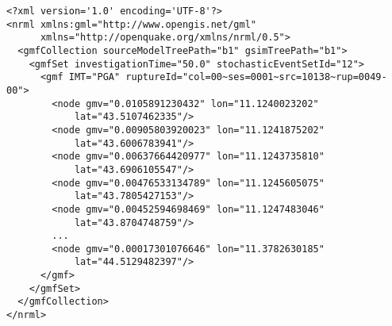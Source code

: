 \begin{Verbatim}[frame=single, commandchars=\\\{\}, fontsize=\small]
<?xml version='1.0' encoding='UTF-8'?>
<nrml xmlns:gml="http://www.opengis.net/gml"
      xmlns="http://openquake.org/xmlns/nrml/0.5">
  <gmfCollection sourceModelTreePath="b1" gsimTreePath="b1">
    <gmfSet investigationTime="50.0" stochasticEventSetId="12">
      <gmf IMT="PGA" ruptureId="col=00~ses=0001~src=10138~rup=0049-00">
        <node gmv="0.0105891230432" lon="11.1240023202"
            lat="43.5107462335"/>
        <node gmv="0.00905803920023" lon="11.1241875202"
            lat="43.6006783941"/>
        <node gmv="0.00637664420977" lon="11.1243735810"
            lat="43.6906105547"/>
        <node gmv="0.00476533134789" lon="11.1245605075"
            lat="43.7805427153"/>
        <node gmv="0.00452594698469" lon="11.1247483046"
            lat="43.8704748759"/>
        ...
        <node gmv="0.00017301076646" lon="11.3782630185"
            lat="44.5129482397"/>
      </gmf>
    </gmfSet>
  </gmfCollection>
</nrml>
\end{Verbatim}